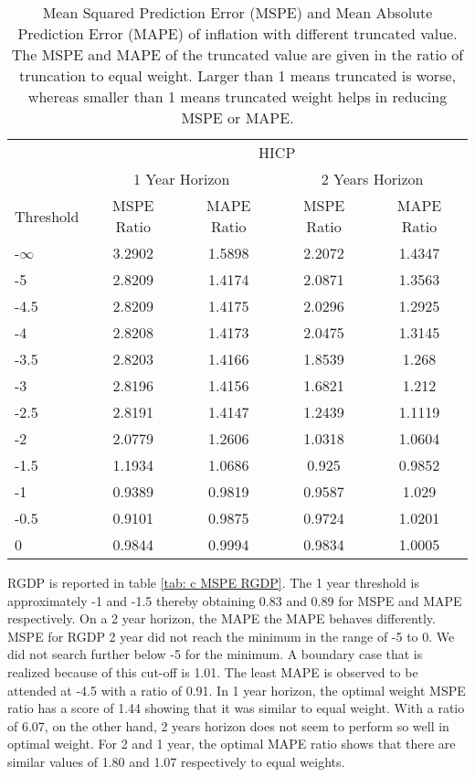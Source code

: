 \documentclass[11pt]{article}
\begin{document}
\begin{table}[!h]
	\centering
	\caption{Mean Squared Prediction Error (MSPE) and Mean Absolute Prediction Error (MAPE) of inflation with different truncated value. The MSPE and MAPE of the truncated value are given in the ratio of truncation to equal weight. Larger than 1 means truncated is worse, whereas smaller than 1 means truncated weight helps in reducing MSPE or MAPE.}
	\label{tab: c MSPE HICP}
	\begin{tabular}{lcccc}
		\hline\hline
		&                        \multicolumn{4}{c}{HICP}                         \\
		\cmidrule(lr){2-5}                              & \multicolumn{2}{c}{1 Year Horizon} & \multicolumn{2}{c}{2 Years Horizon} \\
		\cmidrule(lr){2-3} \cmidrule(lr){4-5}
		Threshold & MSPE Ratio &    MAPE Ratio    & MSPE Ratio &    MAPE Ratio    \\ \hline
-$\infty$ & 3.2902 & 1.5898 & 2.2072 & 1.4347\\ 
-5 & 2.8209 & 1.4174 & 2.0871 & 1.3563\\ 
-4.5 & 2.8209 & 1.4175 & 2.0296 & 1.2925\\ 
-4 & 2.8208 & 1.4173 & 2.0475 & 1.3145\\ 
-3.5 & 2.8203 & 1.4166 & 1.8539 & 1.268\\ 
-3 & 2.8196 & 1.4156 & 1.6821 & 1.212\\ 
-2.5 & 2.8191 & 1.4147 & 1.2439 & 1.1119\\ 
-2 & 2.0779 & 1.2606 & 1.0318 & 1.0604\\ 
-1.5 & 1.1934 & 1.0686 & 0.925 & 0.9852\\ 
-1 & 0.9389 & 0.9819 & 0.9587 & 1.029\\ 
-0.5 & 0.9101 & 0.9875 & 0.9724 & 1.0201\\ 
0 & 0.9844 & 0.9994 & 0.9834 & 1.0005\\ 
\hline\hline
	\end{tabular}
\end{table}

RGDP is reported in table \ref{tab: c MSPE RGDP}.  The 1 year threshold is approximately -1 and -1.5 thereby obtaining 0.83 and 0.89 for MSPE and MAPE respectively. On a 2 year horizon, the MAPE the MAPE behaves differently. MSPE for RGDP 2 year did not reach the minimum in the range of -5 to 0. We did not search further below -5 for the minimum. A boundary case that is realized because of this cut-off is 1.01. The least MAPE is observed to be attended at -4.5 with a ratio of 0.91. In 1 year horizon, the optimal weight MSPE ratio has a score of 1.44 showing that it was similar to equal weight. With a ratio of 6.07, on the other hand, 2 years horizon does not seem to perform so well in optimal weight. For 2 and 1 year, the optimal MAPE ratio shows that there are similar values of 1.80 and 1.07 respectively to equal weights. 
\end{document}
